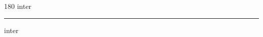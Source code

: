 
\begin{frame}
\begin{center}
\begin{turn}{180}
{\fontsize{2.5cm}{1em}\selectfont inter}
\end{turn}
\vspace{1em}\par  
\hrule
\vspace{1em}\par  
{\fontsize{2.5cm}{1em}\selectfont inter}
\end{center}
\end{frame}
